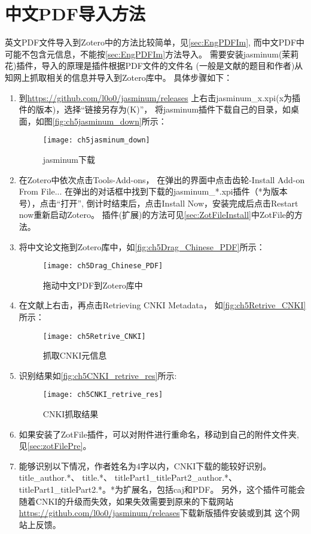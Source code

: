 \documentclass[cn,11pt,chinese]{elegantbook}
\begin{document}
		\section{中文PDF导入方法}\label{sec:Chinese_PDF}
			英文PDF文件导入到Zotero中的方法比较简单，见\cref{sec:EngPDFIm},
			而中文PDF中可能不包含元信息，不能按\cref{sec:EngPDFIm}方法导入。
			需要安装jasminum(茉莉花)插件，导入的原理是插件根据PDF文件的文件名
			(一般是文献的题目和作者)从知网上抓取相关的信息并导入到Zotero库中。
			具体步骤如下：
			\begin{enumerate}
				\item 到\url{https://github.com/l0o0/jasminum/releases}
				上右击jasminum\_x.xpi(x为插件的版本)，选择“链接另存为(K)”，
				将jasminum插件下载自己的目录，如桌面，如图\autoref{fig:ch5jasminum_down}所示：
	    		\begin{figure}[ht]
					\centering
					\texttt{[image: ch5jasminum\_down]}
					\caption{jasminum下载}
					\label{fig:ch5jasminum_down}
	    		\end{figure}
				\item 在Zotero中依次点击Tools-Add-ons，
				在弹出的界面中点击齿轮-Install Add-on From File...
				在弹出的对话框中找到下载的jasminum\_*.xpi插件（*为版本号），点击“打开”,
				倒计时结束后，点击Install Now，安装完成后点击Restart now重新启动Zotero。
				插件(扩展)的方法可见\cref{sec:ZotFileInstall}中ZotFile的方法。
				\item 将中文论文拖到Zotero库中，如\autoref{fig:ch5Drag_Chinese_PDF}所示：
					\begin{figure}[ht]
						\centering
						\texttt{[image: ch5Drag\_Chinese\_PDF]}
						\caption{拖动中文PDF到Zotero库中}
						\label{fig:ch5Drag_Chinese_PDF}
					\end{figure}
				\item 在文献上右击，再点击Retrieving CNKI Metadata，
				如\autoref{fig:ch5Retrive_CNKI}所示：
					\begin{figure}[ht]
						\centering
						\texttt{[image: ch5Retrive\_CNKI]}
						\caption{抓取CNKI元信息}
						\label{fig:ch5Retrive_CNKI}
					\end{figure}
				\item 识别结果如\autoref{fig:ch5CNKI_retrive_res}所示:
					\begin{figure}[ht]
						\centering
						\texttt{[image: ch5CNKI\_retrive\_res]}
						\caption{CNKI抓取结果}
						\label{fig:ch5CNKI_retrive_res}
					\end{figure}
				\item 如果安装了ZotFile插件，可以对附件进行重命名，移动到自己的附件文件夹,
				见\cref{sec:zotFilePre}。
				\item 能够识别以下情况，作者姓名为4字以内，CNKI下载的能较好识别。
				title\_author.*、
				title.*、
				titlePart1\_titlePart2\_author.*、
				titlePart1\_titlePart2.*。*为扩展名，包括caj和PDF。
				另外，这个插件可能会随着CNKI的升级而失效，如果失效需要到原来的下载网站
				\url{https://github.com/l0o0/jasminum/releases}下载新版插件安装或到其
				这个网站上反馈。


			\end{enumerate}
		
\end{document}
